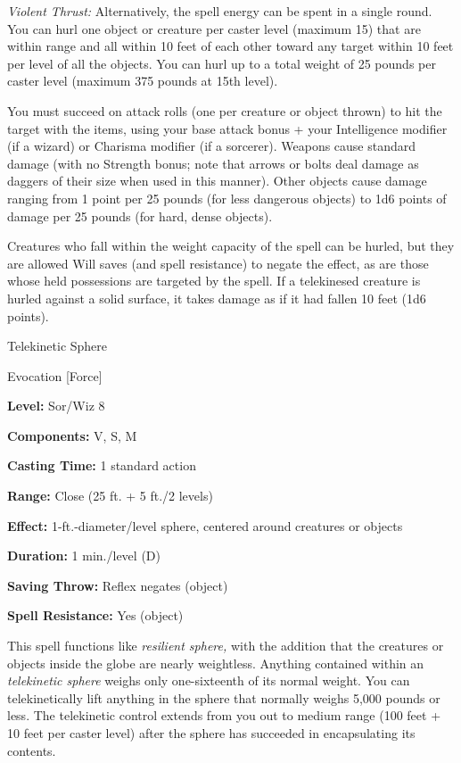 \documentclass{article}
\begin{document}
\textit{Violent Thrust: }Alternatively, the spell energy can be spent in a single 
round. You can hurl one object or creature per caster level (maximum 15) that are 
within range and all within 10 feet of each other toward any target within 10 feet 
per level of all the objects. You can hurl up to a total weight of 25 pounds per 
caster level (maximum 375 pounds at 15th level).

You must succeed on attack rolls (one per creature or object thrown) to hit the 
target with the items, using your base attack bonus + your Intelligence modifier 
(if a wizard) or Charisma modifier (if a sorcerer). Weapons cause standard damage 
(with no Strength bonus; note that arrows or bolts deal damage as daggers of their 
size when used in this manner). Other objects cause damage ranging from 1 point 
per 25 pounds (for less dangerous objects) to 1d6 points of damage per 25 pounds 
(for hard, dense objects).

Creatures who fall within the weight capacity of the spell can be hurled, but they 
are allowed Will saves (and spell resistance) to negate the effect, as are those 
whose held possessions are targeted by the spell. If a telekinesed creature is 
hurled against a solid surface, it takes damage as if it had fallen 10 feet (1d6 
points).

\vspace{12pt}
Telekinetic Sphere

Evocation [Force]

\textbf{Level:} Sor/Wiz 8

\textbf{Components:} V, S, M

\textbf{Casting Time:} 1 standard action

\textbf{Range:} Close (25 ft. + 5 ft./2 levels)

\textbf{Effect:} 1-ft.-diameter/level sphere, centered around creatures or objects

\textbf{Duration:} 1 min./level (D)

\textbf{Saving Throw:} Reflex negates (object)

\textbf{Spell Resistance:} Yes (object)

This spell functions like \textit{resilient sphere, }with the addition that the 
creatures or objects inside the globe are nearly weightless. Anything contained 
within an \textit{telekinetic sphere }weighs only one-sixteenth of its normal weight. 
You can telekinetically lift anything in the sphere that normally weighs 5,000 
pounds or less. The telekinetic control extends from you out to medium range (100 
feet + 10 feet per caster level) after the sphere has succeeded in encapsulating 
its contents.
\end{document}
